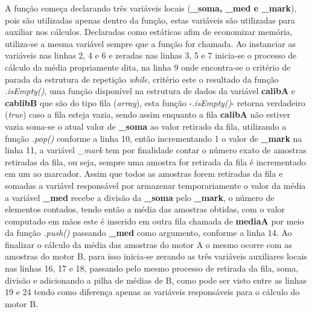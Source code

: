 \documentclass[a4paper,12pt,portuguese]{ufms-cpcx}
\begin{document}
A função começa declarando três variáveis locais (\textbf{\_soma, \_med e \_mark}), pois são utilizadas apenas dentro da função, estas variáveis são utilizadas para auxiliar nos cálculos. 
Declaradas como estáticas afim de economizar memória, utiliza-se a mesma variável sempre que a função for chamada. 
Ao instanciar as variáveis nas linhas 2, 4 e 6 e zeradas nas linhas 3, 5 e 7 inicia-se o processo de cálculo da média propriamente dita, na linha 9 onde encontra-se o critério de parada da estrutura de repetição \textit{while}, critério este o resultado da função \textit{.isEmpty()}, uma função disponível na estrutura de dados da variável \textbf{calibA} e \textbf{cablibB} que são do tipo fila (\textit{array}), esta função -\textit{.isEmpty()}- retorna verdadeiro (\textit{true}) caso a fila esteja vazia, sendo assim enquanto a fila \textbf{calibA} não estiver vazia soma-se o atual valor de \textbf{\_soma} ao valor retirado da fila, utilizando a função \textit{.pop()} conforme a linha 10, então incrementando 1 o valor de \textbf{\_mark} na linha 11, a variável \textit{\_mark} tem por finalidade contar o número exato de amostras retiradas da fila, ou seja, sempre uma amostra for retirada da fila é incrementado em um ao marcador. Assim que todos as amostras forem retiradas da fila e somadas a variável responsável por armazenar temporariamente o valor da média a variável \textbf{\_med} recebe a divisão da \textbf{\_soma} pelo \textbf{\_mark}, o número de elementos contados, tendo então a média das amostras obtidas, com o valor computado em mãos este é inserido em outra fila chamada de \textbf{mediaA} por meio da função \textit{.push()} passando \textbf{\_med} como argumento, conforme a linha 14. Ao finalizar o cálculo da média das amostras do motor A o mesmo ocorre com as amostras do motor B, para isso inicia-se zerando as três variáveis auxiliares locais nas linhas 16, 17 e 18, passando pelo mesmo processo de retirada da fila, soma, divisão e adicionando a pilha de médias de B, como pode ser visto entre as linhas 19 e 24 tendo como diferença apenas as variáveis responsáveis para o cálculo do motor B.
\end{document}
